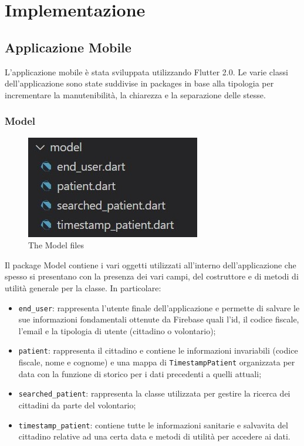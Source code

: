 \documentclass[12pt,a4paper,twoside,openright,titlepage]{book}
\begin{document}
\chapter{Implementazione}
\section{Applicazione Mobile}
L'applicazione mobile è stata sviluppata utilizzando Flutter 2.0. Le varie classi dell'applicazione sono state suddivise in packages in base alla tipologia per incrementare la manutenibilità, la chiarezza e la separazione delle stesse.

\subsection{Model}
\begin{figure}[H]
\centering
\includegraphics[scale = 1.0]{model}
\caption{The Model files}
\end{figure}
Il package Model contiene i vari oggetti utilizzati all'interno dell'applicazione che spesso si presentano con la presenza dei vari campi, del costruttore e di metodi di utilità generale per la classe. In particolare:
\begin{itemize}
\item \texttt{end\_user}: rappresenta l'utente finale dell'applicazione e permette di salvare le sue informazioni fondamentali ottenute da Firebase quali l'id, il codice fiscale, l'email e la tipologia di utente (cittadino o volontario);
\item \texttt{patient}: rappresenta il cittadino e contiene le informazioni invariabili (codice fiscale, nome e cognome) e una mappa di \texttt{TimestampPatient} organizzata per data con la funzione di storico per i dati precedenti a quelli attuali;
\item \texttt{searched\_patient}: rappresenta la classe utilizzata per gestire la ricerca dei cittadini da parte del volontario;
\item \texttt{timestamp\_patient}: contiene tutte le informazioni sanitarie e salvavita del cittadino relative ad una certa data e metodi di utilità per accedere ai dati.
\end{itemize}
\end{document}
